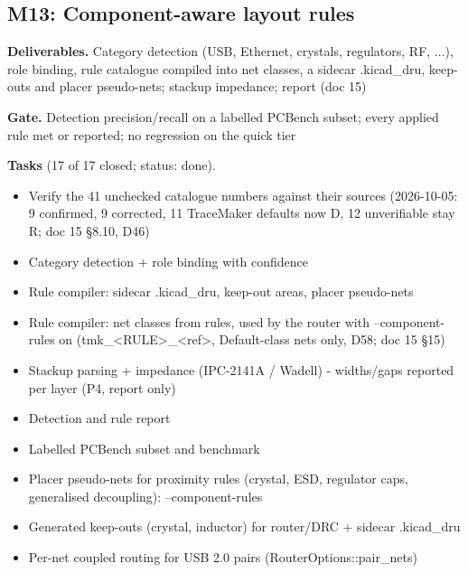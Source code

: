 \subsection*{M13: Component-aware layout rules}
\noindent\textbf{Deliverables.} Category detection (USB, Ethernet, crystals, regulators, RF, ...), role binding, rule catalogue compiled into net classes, a sidecar .kicad\_dru, keep-outs and placer pseudo-nets; stackup impedance; report (doc 15)\par\smallskip
\noindent\textbf{Gate.} Detection precision/recall on a labelled PCBench subset; every applied rule met or reported; no regression on the quick tier\par\smallskip
\noindent\textbf{Tasks} (17 of 17 closed; status: done).
\begin{itemize}[leftmargin=1.6em,itemsep=1pt]
\item[\textcolor{fraqua}{$\checkmark$}] Verify the 41 unchecked catalogue numbers against their sources (2026-10-05: 9 confirmed, 9 corrected, 11 TraceMaker defaults now D, 12 unverifiable stay R; doc 15 \S8.10, D46)
\item[\textcolor{fraqua}{$\checkmark$}] Category detection + role binding with confidence
\item[\textcolor{fraqua}{$\checkmark$}] Rule compiler: sidecar .kicad\_dru, keep-out areas, placer pseudo-nets
\item[\textcolor{fraqua}{$\checkmark$}] Rule compiler: net classes from rules, used by the router with --component-rules on (tmk\_\textless{}RULE\textgreater{}\_\textless{}ref\textgreater{}, Default-class nets only, D58; doc 15 \S15)
\item[\textcolor{fraqua}{$\checkmark$}] Stackup parsing + impedance (IPC-2141A / Wadell) - widths/gaps reported per layer (P4, report only)
\item[\textcolor{fraqua}{$\checkmark$}] Detection and rule report
\item[\textcolor{fraqua}{$\checkmark$}] Labelled PCBench subset and benchmark
\item[\textcolor{fraqua}{$\checkmark$}] Placer pseudo-nets for proximity rules (crystal, ESD, regulator caps, generalised decoupling): --component-rules
\item[\textcolor{fraqua}{$\checkmark$}] Generated keep-outs (crystal, inductor) for router/DRC + sidecar .kicad\_dru
\item[\textcolor{fraqua}{$\checkmark$}] Per-net coupled routing for USB 2.0 pairs (RouterOptions::pair\_nets)

\end{itemize}
